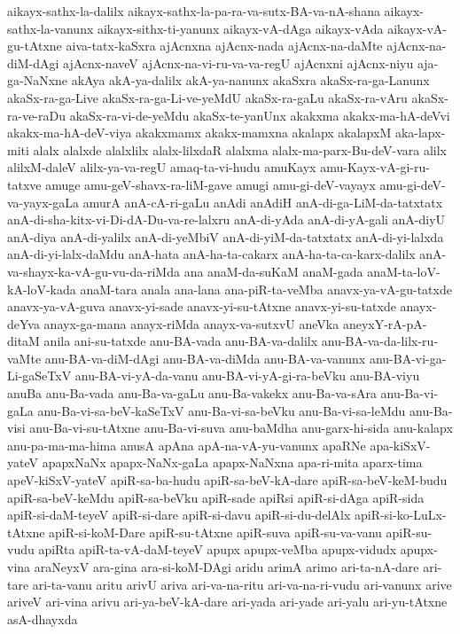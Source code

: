 {aikayx-sathx-la-dalilx
aikayx-sathx-la-pa-ra-va-sutx-BA-va-nA-shana
aikayx-sathx-la-vanunx
aikayx-sithx-ti-yanunx
aikayx-vA-dAga
aikayx-vAda
aikayx-vA-gu-tAtxne
aiva-tatx-kaSxra
ajAcnxna
ajAcnx-nada
ajAcnx-na-daMte
ajAcnx-na-diM-dAgi
ajAcnx-naveV
ajAcnx-na-vi-ru-va-va-regU
ajAcnxni
ajAcnx-niyu
aja-ga-NaNxne
akAya
akA-ya-dalilx
akA-ya-nanunx
akaSxra
akaSx-ra-ga-Lanunx
akaSx-ra-ga-Live
akaSx-ra-ga-Li-ve-yeMdU
akaSx-ra-gaLu
akaSx-ra-vAru
akaSx-ra-ve-raDu
akaSx-ra-vi-de-yeMdu
akaSx-te-yanUnx
akakxma
akakx-ma-hA-deVvi
akakx-ma-hA-deV-viya
akakxmamx
akakx-mamxna
akalapx
akalapxM
aka-lapx-miti
alalx
alalxde
alalxlilx
alalx-lilxdaR
alalxma
alalx-ma-parx-Bu-deV-vara
alilx
alilxM-daleV
alilx-ya-va-regU
amaq-ta-vi-hudu
amuKayx
amu-Kayx-vA-gi-ru-tatxve
amuge
amu-geV-shavx-ra-liM-gave
amugi
amu-gi-deV-vayayx
amu-gi-deV-va-yayx-gaLa
amurA
anA-cA-ri-gaLu
anAdi
anAdiH
anA-di-ga-LiM-da-tatxtatx
anA-di-sha-kitx-vi-Di-dA-Du-va-re-lalxru
anA-di-yAda
anA-di-yA-gali
anA-diyU
anA-diya
anA-di-yalilx
anA-di-yeMbiV
anA-di-yiM-da-tatxtatx
anA-di-yi-lalxda
anA-di-yi-lalx-daMdu
anA-hata
anA-ha-ta-cakarx
anA-ha-ta-ca-karx-dalilx
anA-va-shayx-ka-vA-gu-vu-da-riMda
ana
anaM-da-suKaM
anaM-gada
anaM-ta-loV-kA-loV-kada
anaM-tara
anala
ana-lana
ana-piR-ta-veMba
anavx-ya-vA-gu-tatxde
anavx-ya-vA-guva
anavx-yi-sade
anavx-yi-su-tAtxne
anavx-yi-su-tatxde
anayx-deYva
anayx-ga-mana
anayx-riMda
anayx-va-sutxvU
aneVka
aneyxY-rA-pA-ditaM
anila
ani-su-tatxde
anu-BA-vada
anu-BA-va-dalilx
anu-BA-va-da-lilx-ru-vaMte
anu-BA-va-diM-dAgi
anu-BA-va-diMda
anu-BA-va-vanunx
anu-BA-vi-ga-Li-gaSeTxV
anu-BA-vi-yA-da-vanu
anu-BA-vi-yA-gi-ra-beVku
anu-BA-viyu
anuBa
anu-Ba-vada
anu-Ba-va-gaLu
anu-Ba-vakekx
anu-Ba-va-sAra
anu-Ba-vi-gaLa
anu-Ba-vi-sa-beV-kaSeTxV
anu-Ba-vi-sa-beVku
anu-Ba-vi-sa-leMdu
anu-Ba-visi
anu-Ba-vi-su-tAtxne
anu-Ba-vi-suva
anu-baMdha
anu-garx-hi-sida
anu-kalapx
anu-pa-ma-ma-hima
anusA
apAna
apA-na-vA-yu-vanunx
apaRNe
apa-kiSxV-yateV
apapxNaNx
apapx-NaNx-gaLa
apapx-NaNxna
apa-ri-mita
aparx-tima
apeV-kiSxV-yateV
apiR-sa-ba-hudu
apiR-sa-beV-kA-dare
apiR-sa-beV-keM-budu
apiR-sa-beV-keMdu
apiR-sa-beVku
apiR-sade
apiRsi
apiR-si-dAga
apiR-sida
apiR-si-daM-teyeV
apiR-si-dare
apiR-si-davu
apiR-si-du-delAlx
apiR-si-ko-LuLx-tAtxne
apiR-si-koM-Dare
apiR-su-tAtxne
apiR-suva
apiR-su-va-vanu
apiR-su-vudu
apiRta
apiR-ta-vA-daM-teyeV
apupx
apupx-veMba
apupx-vidudx
apupx-vina
araNeyxV
ara-gina
ara-si-koM-DAgi
aridu
arimA
arimo
ari-ta-nA-dare
ari-tare
ari-ta-vanu
aritu
arivU
ariva
ari-va-na-ritu
ari-va-na-ri-vudu
ari-vanunx
arive
ariveV
ari-vina
arivu
ari-ya-beV-kA-dare
ari-yada
ari-yade
ari-yalu
ari-yu-tAtxne
asA-dhayxda
}
